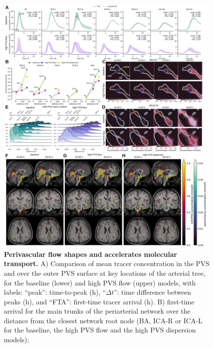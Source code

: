 \documentclass[fleqn,10pt]{wlscirep}
\begin{document}
\begin{figure}
    \centering
    \includegraphics[width=0.99\textwidth]{figures/figure3b.png}
    \caption{\textbf{Perivascular flow shapes and accelerates molecular transport.}
    A) Comparison of mean tracer concentration in the PVS and over the outer PVS surface at key locations of the arterial tree, for the baseline (lower) and high PVS flow (upper) models, with labels: ``peak'': time-to-peak (h), ``$\Delta t$'': time difference between peaks (h), and ``FTA'': first-time tracer arrival (h).
    B) first-time arrival for the main trunks of the periarterial network over the distance from the closest network root node (BA, ICA-R or ICA-L for the baseline, the high PVS flow and the high PVS dispersion models);}
    \label{fig:pvs_b}
\end{figure}
\end{document}
